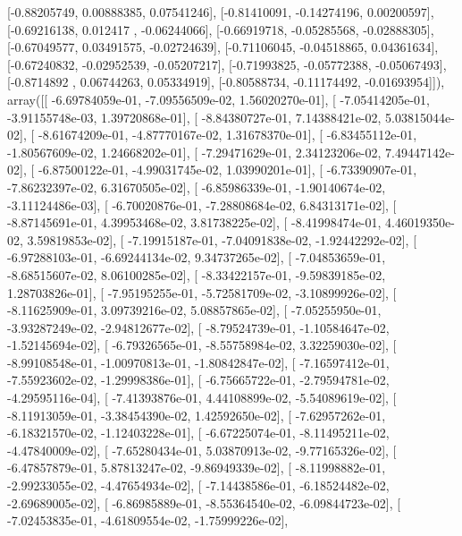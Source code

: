 \documentclass{article}
\begin{document}
       [-0.88205749,  0.00888385,  0.07541246],
       [-0.81410091, -0.14274196,  0.00200597],
       [-0.69216138,  0.012417  , -0.06244066],
       [-0.66919718, -0.05285568, -0.02888305],
       [-0.67049577,  0.03491575, -0.02724639],
       [-0.71106045, -0.04518865,  0.04361634],
       [-0.67240832, -0.02952539, -0.05207217],
       [-0.71993825, -0.05772388, -0.05067493],
       [-0.8714892 ,  0.06744263,  0.05334919],
       [-0.80588734, -0.11174492, -0.01693954]]), array([[ -6.69784059e-01,  -7.09556509e-02,   1.56020270e-01],
       [ -7.05414205e-01,  -3.91155748e-03,   1.39720868e-01],
       [ -8.84380727e-01,   7.14388421e-02,   5.03815044e-02],
       [ -8.61674209e-01,  -4.87770167e-02,   1.31678370e-01],
       [ -6.83455112e-01,  -1.80567609e-02,   1.24668202e-01],
       [ -7.29471629e-01,   2.34123206e-02,   7.49447142e-02],
       [ -6.87500122e-01,  -4.99031745e-02,   1.03990201e-01],
       [ -6.73390907e-01,  -7.86232397e-02,   6.31670505e-02],
       [ -6.85986339e-01,  -1.90140674e-02,  -3.11124486e-03],
       [ -6.70020876e-01,  -7.28808684e-02,   6.84313171e-02],
       [ -8.87145691e-01,   4.39953468e-02,   3.81738225e-02],
       [ -8.41998474e-01,   4.46019350e-02,   3.59819853e-02],
       [ -7.19915187e-01,  -7.04091838e-02,  -1.92442292e-02],
       [ -6.97288103e-01,  -6.69244134e-02,   9.34737265e-02],
       [ -7.04853659e-01,  -8.68515607e-02,   8.06100285e-02],
       [ -8.33422157e-01,  -9.59839185e-02,   1.28703826e-01],
       [ -7.95195255e-01,  -5.72581709e-02,  -3.10899926e-02],
       [ -8.11625909e-01,   3.09739216e-02,   5.08857865e-02],
       [ -7.05255950e-01,  -3.93287249e-02,  -2.94812677e-02],
       [ -8.79524739e-01,  -1.10584647e-02,  -1.52145694e-02],
       [ -6.79326565e-01,  -8.55758984e-02,   3.32259030e-02],
       [ -8.99108548e-01,  -1.00970813e-01,  -1.80842847e-02],
       [ -7.16597412e-01,  -7.55923602e-02,  -1.29998386e-01],
       [ -6.75665722e-01,  -2.79594781e-02,  -4.29595116e-04],
       [ -7.41393876e-01,   4.44108899e-02,  -5.54089619e-02],
       [ -8.11913059e-01,  -3.38454390e-02,   1.42592650e-02],
       [ -7.62957262e-01,  -6.18321570e-02,  -1.12403228e-01],
       [ -6.67225074e-01,  -8.11495211e-02,  -4.47840009e-02],
       [ -7.65280434e-01,   5.03870913e-02,  -9.77165326e-02],
       [ -6.47857879e-01,   5.87813247e-02,  -9.86949339e-02],
       [ -8.11998882e-01,  -2.99233055e-02,  -4.47654934e-02],
       [ -7.14438586e-01,  -6.18524482e-02,  -2.69689005e-02],
       [ -6.86985889e-01,  -8.55364540e-02,  -6.09844723e-02],
       [ -7.02453835e-01,  -4.61809554e-02,  -1.75999226e-02],
\end{document}
